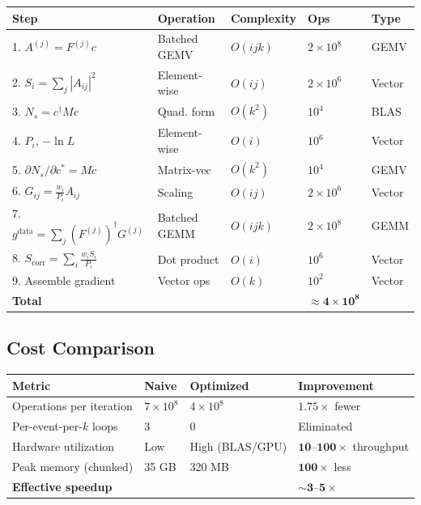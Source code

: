 \documentclass[11pt,a4paper]{article}
\begin{document}
\begin{center}
\begin{tabular}{@{}lllll@{}}
\toprule
\textbf{Step} & \textbf{Operation} & \textbf{Complexity} & \textbf{Ops} & \textbf{Type} \\ \midrule
1. $A^{(j)} = F^{(j)} c$ & Batched GEMV & $O(ijk)$ & $2\times 10^8$ & GEMV \\
2. $S_i = \sum_j |A_{ij}|^2$ & Element-wise & $O(ij)$ & $2\times 10^6$ & Vector \\
3. $N_s = c^\dagger M c$ & Quad. form & $O(k^2)$ & $10^4$ & BLAS \\
4. $P_i$, $-\ln L$ & Element-wise & $O(i)$ & $10^6$ & Vector \\
5. $\partial N_s/\partial c^* = Mc$ & Matrix-vec & $O(k^2)$ & $10^4$ & GEMV \\
6. $G_{ij} = \frac{w_i}{P_i} A_{ij}$ & Scaling & $O(ij)$ & $2\times 10^6$ & Vector \\
7. $g^{\text{data}} = \sum_j (F^{(j)})^\dagger G^{(j)}$ & Batched GEMM & $O(ijk)$ & $2\times 10^8$ & GEMM \\
8. $S_{\text{corr}} = \sum_i \frac{w_i S_i}{P_i}$ & Dot product & $O(i)$ & $10^6$ & Vector \\
9. Assemble gradient & Vector ops & $O(k)$ & $10^2$ & Vector \\
\textbf{Total} & & & $\mathbf{\approx 4\times 10^8}$ & \\ \bottomrule
\end{tabular}
\end{center}

\subsection{Cost Comparison}

\begin{center}
\begin{tabular}{@{}llll@{}}
\toprule
\textbf{Metric} & \textbf{Naive} & \textbf{Optimized} & \textbf{Improvement} \\ \midrule
Operations per iteration & $7 \times 10^8$ & $4 \times 10^8$ & $\mathbf{1.75\times}$ fewer \\
Per-event-per-$k$ loops & $3$ & $0$ & Eliminated \\
Hardware utilization & Low & High (BLAS/GPU) & $\mathbf{10\text{--}100\times}$ throughput \\
Peak memory (chunked) & 35 GB & 320 MB & $\mathbf{100\times}$ less \\
\textbf{Effective speedup} & & & $\mathbf{\sim 3\text{--}5\times}$ \\ \bottomrule
\end{tabular}
\end{center}
\end{document}
